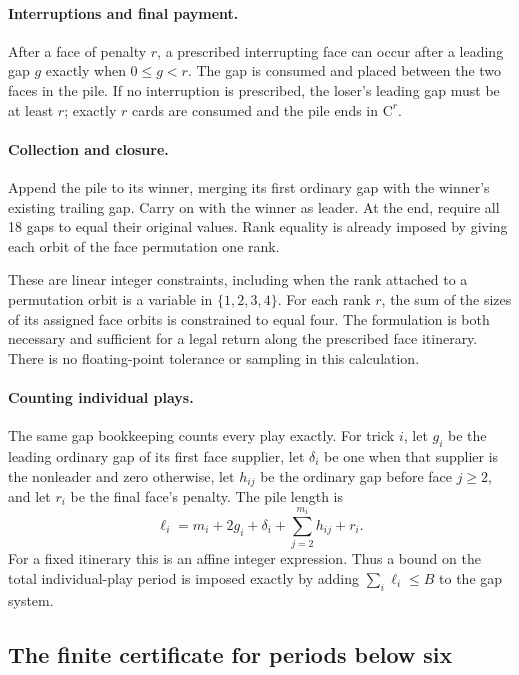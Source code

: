 \documentclass[11pt]{article}
\newcommand{\CC}{\mathrm C}
\begin{document}
\paragraph{Interruptions and final payment.}
After a face of penalty $r$, a prescribed interrupting face can occur after
a leading gap $g$ exactly when $0\le g<r$. The gap is consumed and placed
between the two faces in the pile. If no interruption is prescribed, the
loser's leading gap must be at least $r$; exactly $r$ cards are consumed and
the pile ends in $\CC^r$.

\paragraph{Collection and closure.}
Append the pile to its winner, merging its first ordinary gap with the
winner's existing trailing gap. Carry on with the winner as leader. At the
end, require all 18 gaps to equal their original values. Rank equality is
already imposed by giving each orbit of the face permutation one rank.

These are linear integer constraints, including when the rank attached to
a permutation orbit is a variable in $\{1,2,3,4\}$. For each rank $r$, the
sum of the sizes of its assigned face orbits is constrained to equal four.
The formulation is both necessary and sufficient for a legal return along
the prescribed face itinerary. There is no floating-point tolerance or
sampling in this calculation.

\paragraph{Counting individual plays.}
The same gap bookkeeping counts every play exactly. For trick $i$, let $g_i$
be the leading ordinary gap of its first face supplier, let $\delta_i$ be
one when that supplier is the nonleader and zero otherwise, let $h_{ij}$
be the ordinary gap before face $j\ge2$, and let $r_i$ be the final face's
penalty. The pile length is
\begin{equation}\label{eq:exact-play-count}
\ell_i=m_i+2g_i+\delta_i+\sum_{j=2}^{m_i}h_{ij}+r_i.
\end{equation}
For a fixed itinerary this is an affine integer expression. Thus a bound
on the total individual-play period is imposed exactly by adding
$\sum_i\ell_i\le B$ to the gap system.

\subsection{The finite certificate for periods below six}
\end{document}
